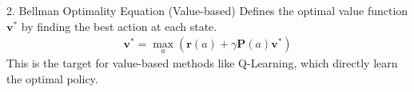 \begin{frame}
\begin{columns}[T]
\begin{column}{0.5\textwidth}
            \vspace{1em}

            \begin{block}{2. Bellman Optimality Equation (Value-based)}
                Defines the optimal value function $\mathbf{v}^*$ by finding the best action at each state.
                \begin{align*}
                    \mathbf{v}^{*} = \max_{a} \left( \mathbf{r}(a) + \gamma \mathbf{P}(a) \mathbf{v}^{*} \right)
                \end{align*}
                This is the target for value-based methods like Q-Learning, which directly learn the optimal policy.
            \end{block}

        \end{column}

    \end{columns}
\end{frame}

